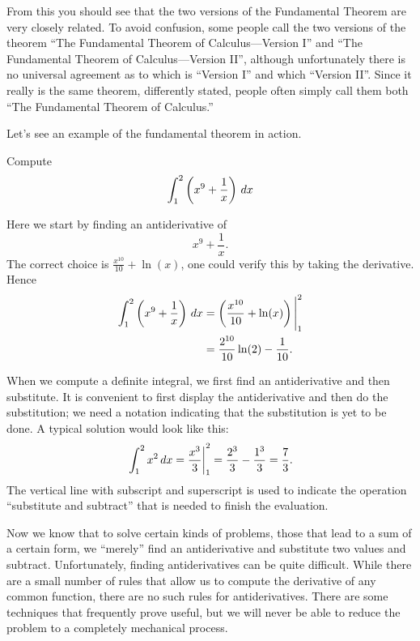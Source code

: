 From this you should see that the two versions of the Fundamental
Theorem are very closely related. To avoid confusion, some people call
the two versions of the theorem ``The Fundamental Theorem of
Calculus---Version I'' and ``The Fundamental Theorem of
Calculus---Version II'', although unfortunately there is no universal
agreement as to which is ``Version I'' and which ``Version II''. Since
it really is the same theorem, differently stated, people often simply
call them both ``The Fundamental Theorem of Calculus.''

Let's see an example of the fundamental theorem in action.

\begin{example}
Compute
\[
\int_1^2\left(x^9 + \frac{1}{x}\right) \, d x
\]
\end{example}

\begin{solution}
Here we start by finding an antiderivative of 
\[
x^9 + \frac{1}{x}.
\]
The correct choice is $\frac{x^{10}}{10} + \ln(x)$, one could verify this by
taking the derivative. Hence
\begin{align*}
\int_1^2\left(x^9 + \frac{1}{x}\right) \, d x &= \left(\frac{x^{10}}{10} + \ln(x)\right)\Bigg|_1^2 \\
&= \frac{2^{10}}{10} \ln(2) - \frac{1}{10}.
\end{align*}
\end{solution}


When we compute a definite integral, we first find an antiderivative
and then substitute. It is convenient to first display the
antiderivative and then do the substitution; we need a notation
indicating that the substitution is yet to be done. A typical solution
would look like this:
\[
  \left.\int_1^2 x^2\, d x={x^3\over 3}\right|_1^2 = 
  {2^3\over3}-{1^3\over3}={7\over3}.
\]
The vertical line with subscript and superscript is used to indicate
the operation ``substitute and subtract'' that is needed to finish the
evaluation. 

Now we know that to solve certain kinds of problems, those that lead
to a sum of a certain form, we ``merely'' find an antiderivative and
substitute two values and subtract. Unfortunately, finding
antiderivatives can be quite difficult. While there are a small number
of rules that allow us to compute the derivative of any common
function, there are no such rules for antiderivatives. There are some
techniques that frequently prove useful, but we will never be able to
reduce the problem to a completely mechanical process.






